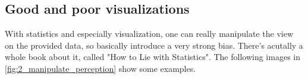 







\subsection*{Good and poor visualizations}
With statistics and especially visualization, one can really manipulate the view on the provided data, so basically introduce a very strong bias. There's acutally a whole book about it, called "How to Lie with Statistics". The following images in \ref{fig:2_manipulate_perception} show some examples.


